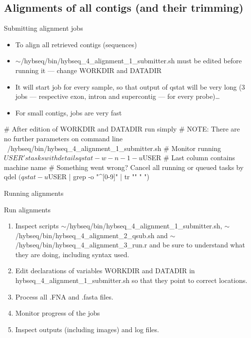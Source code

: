\documentclass[compress,  xelatex, 11pt, xcolor=x11names, aspectratio=169,
	hyperref={
		bookmarks=true,
		unicode=true,
		colorlinks=true,
		pdftitle={HybSeq course},
		plainpages=false,
		pdfauthor={Vojtech Zeisek},
		pdfsubject={Practical processing of HybSeq target enrichment sequencing data on computing grids like MetaCentrum},
		pdfcreator={XeLaTeX},
		pdfkeywords={BASH, command line, GNU, HybSeq, Linux, MetaCentrum, sequencing shell, target enrichment},
		linkcolor=Turquoise4, %
		anchorcolor=DodgerBlue4, %
		citecolor=DodgerBlue4, %
		filecolor=DodgerBlue4, %
		menucolor=Tan4, %
		urlcolor=DarkOliveGreen4 %
		},
	url={hyphens, lowtilde} %
	]{beamer}
\renewcommand{\texttt}[1]{\colorbox{Cornsilk2}{{\ttfamily #1}}}
\renewcommand{\alert}[1]{\textcolor{OrangeRed3}{#1}}
\begin{document}
\subsection{Alignments of all contigs (and their trimming)}

\begin{frame}[fragile]{Submitting alignment jobs}
	\begin{itemize}
		\item To align all retrieved contigs (sequences)
		\item \alert{\texttt{$\sim$/hybseq/bin/hybseq\_4\_alignment\_1\_submitter.sh} must be edited before running it --- change \texttt{WORKDIR} and \texttt{DATADIR}}
		\item It will start job for every sample, so that output of \texttt{qstat} will be very long (3 jobs --- respective exon, intron and supercontig --- for every probe)\ldots
		\item For small contigs, jobs are very fast
	\end{itemize}
	\begin{bashcode}
    # After edition of WORKDIR and DATADIR run simply
    # NOTE: There are no further parameters on command line
    ~/hybseq/bin/hybseq_4_alignment_1_submitter.sh
    # Monitor running $USER's tasks with details
    qstat -w -n -1 -u $USER # Last column contains machine name
    # Something went wrong? Cancel all running or queued tasks by
    qdel $(qstat -u $USER | grep -o "^[0-9]\+" | tr "\n" " ")
	\end{bashcode}
\end{frame}

\begin{frame}{Running alignments}
	\begin{exampleblock}{Run alignments}
		\begin{enumerate}
			\item Inspect scripts \texttt{$\sim$/hybseq/bin/hybseq\_4\_alignment\_1\_submitter.sh}, \texttt{$\sim$/hybseq/bin/hybseq\_4\_alignment\_2\_qsub.sh} and \texttt{$\sim$/hybseq/bin/hybseq\_4\_alignment\_3\_run.r} and be sure to understand what they are doing, including syntax used.
			\item Edit declarations of variables \texttt{WORKDIR} and \texttt{DATADIR} in \texttt{hybseq\_4\_alignment\_1\_submitter.sh} so that they point to correct locations.
			\item Process all \texttt{*.FNA} and \texttt{*.fasta} files.
			\item Monitor progress of the jobs
			\item Inspect outputs (including images) and log files.
		\end{enumerate}
	\end{exampleblock}
\end{frame}
\end{document}
